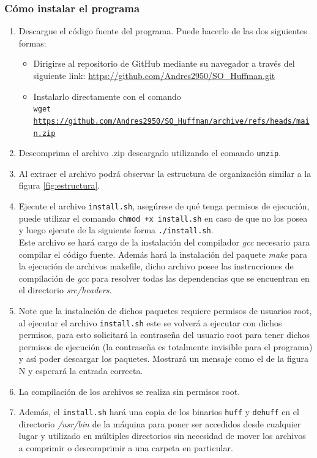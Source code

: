 \documentclass{report}
\begin{document}
\subsubsection{Cómo instalar el programa}
\begin{enumerate}
  \item Descargue el código fuente del programa. Puede hacerlo de las dos siguientes formas:
    \begin{itemize}
      \item Dirigirse al repositorio de GitHub mediante su navegador a través del siguiente link: \url{https://github.com/Andres2950/SO\_Huffman.git}
      \item Instalarlo directamente con el comando \\
    \texttt{wget \url{https://github.com/Andres2950/SO\_Huffman/archive/refs/heads/main.zip}}
    \end{itemize}
  \item Descomprima el archivo .zip descargado utilizando el comando \texttt{unzip}.
  \item Al extraer el archivo podrá observar la estructura de organización similar a la figura \ref{fig:estructura}.
\item Ejecute el archivo \texttt{install.sh}, asegúrese de qué tenga permisos de ejecución, puede utilizar el comando \texttt{chmod +x install.sh} en caso de que no los posea y luego ejecute de la siguiente forma \texttt{./install.sh}. \\
  Este archivo se hará cargo de la instalación del compilador \textit{gcc} necesario para compilar el código fuente. Además hará la instalación del paquete \textit{make} para la ejecución de archivos makefile, dicho archivo posee las instrucciones de compilación de \textit{gcc} para resolver todas las dependencias que se encuentran en el directorio \textit{src/headers}.  
\item Note que la instalación de dichos paquetes requiere permisos de usuarios root, al ejecutar el archivo \texttt{install.sh} este se volverá a ejecutar con dichos permisos, para esto solicitará la contraseña del usuario root para tener dichos permisos de ejecución (la contraseña es totalmente invisible para el programa) y así poder descargar los paquetes. Mostrará un mensaje como el de la figura N y esperará la entrada correcta.
\item La compilación de los archivos se realiza sin permisos root.
\item Además, el \texttt{install.sh} hará una copia de los binarios \texttt{huff} y \texttt{dehuff} en el directorio \textit{/usr/bin} de la máquina para poner ser accedidos desde cualquier lugar y utilizado en múltiples directorios sin necesidad de mover los archivos a comprimir o descomprimir a una carpeta en particular.

\end{enumerate}
\end{document}
